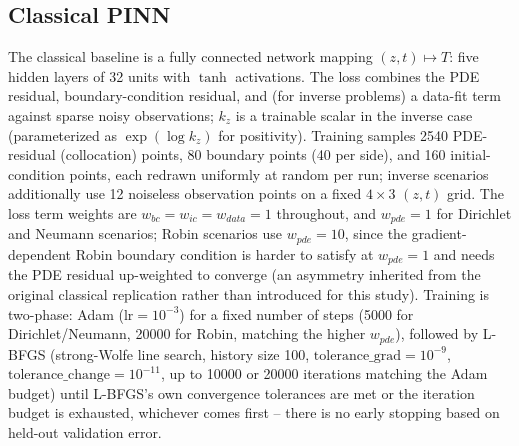 \subsection{Classical PINN}
The classical baseline is a fully connected network mapping $(z, t) \mapsto
T$: five hidden layers of 32 units with $\tanh$ activations. The loss
combines the PDE residual, boundary-condition residual, and (for inverse
problems) a data-fit term against sparse noisy observations; $k_z$ is a
trainable scalar in the inverse case (parameterized as $\exp(\log k_z)$ for
positivity). Training samples 2540 PDE-residual (collocation) points, 80
boundary points (40 per side), and 160 initial-condition points, each
redrawn uniformly at random per run; inverse scenarios additionally use 12
noiseless observation points on a fixed $4\times 3$ $(z,t)$ grid. The loss
term weights are $w_{bc}=w_{ic}=w_{data}=1$ throughout, and $w_{pde}=1$ for
Dirichlet and Neumann scenarios; Robin scenarios use $w_{pde}=10$, since
the gradient-dependent Robin boundary condition is harder to satisfy at
$w_{pde}=1$ and needs the PDE residual up-weighted to converge (an
asymmetry inherited from the original classical replication rather than
introduced for this study). Training is two-phase: Adam ($\mathrm{lr}=
10^{-3}$) for a fixed number of steps (5000 for Dirichlet/Neumann, 20000
for Robin, matching the higher $w_{pde}$), followed by L-BFGS (strong-Wolfe
line search, history size 100, $\mathrm{tolerance\_grad}=10^{-9}$,
$\mathrm{tolerance\_change}=10^{-11}$, up to 10000 or 20000 iterations
matching the Adam budget) until L-BFGS's own convergence tolerances are
met or the iteration budget is exhausted, whichever comes first -- there
is no early stopping based on held-out validation error.

